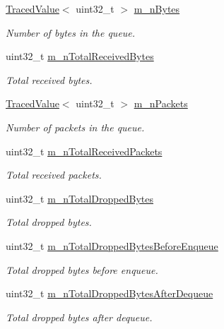\begin{DoxyCompactItemize}
\item 
\hyperlink{classns3_1_1TracedValue}{Traced\+Value}$<$ uint32\+\_\+t $>$ \hyperlink{classns3_1_1QueueBase_ac6294a28b80d4039bb4a0c8a336ed1fe}{m\+\_\+n\+Bytes}
\begin{DoxyCompactList}\small\item\em Number of bytes in the queue. \end{DoxyCompactList}\item 
uint32\+\_\+t \hyperlink{classns3_1_1QueueBase_ad4407ad7faaf49e1e1e78395bdf875aa}{m\+\_\+n\+Total\+Received\+Bytes}
\begin{DoxyCompactList}\small\item\em Total received bytes. \end{DoxyCompactList}\item 
\hyperlink{classns3_1_1TracedValue}{Traced\+Value}$<$ uint32\+\_\+t $>$ \hyperlink{classns3_1_1QueueBase_a1b9e3767ab060e792378c35ef7a67427}{m\+\_\+n\+Packets}
\begin{DoxyCompactList}\small\item\em Number of packets in the queue. \end{DoxyCompactList}\item 
uint32\+\_\+t \hyperlink{classns3_1_1QueueBase_a38f86662dd25be4c5a91eb6d23af42ea}{m\+\_\+n\+Total\+Received\+Packets}
\begin{DoxyCompactList}\small\item\em Total received packets. \end{DoxyCompactList}\item 
uint32\+\_\+t \hyperlink{classns3_1_1QueueBase_a87781232ba70a4ddcf09988b5b259fd6}{m\+\_\+n\+Total\+Dropped\+Bytes}
\begin{DoxyCompactList}\small\item\em Total dropped bytes. \end{DoxyCompactList}\item 
uint32\+\_\+t \hyperlink{classns3_1_1QueueBase_a0e961c057131d9b539598aeb2379136f}{m\+\_\+n\+Total\+Dropped\+Bytes\+Before\+Enqueue}
\begin{DoxyCompactList}\small\item\em Total dropped bytes before enqueue. \end{DoxyCompactList}\item 
uint32\+\_\+t \hyperlink{classns3_1_1QueueBase_acfe5d9451497268dad2e769552d1a9ed}{m\+\_\+n\+Total\+Dropped\+Bytes\+After\+Dequeue}
\begin{DoxyCompactList}\small\item\em Total dropped bytes after dequeue. \end{DoxyCompactList}\item 

\end{DoxyCompactItemize}
